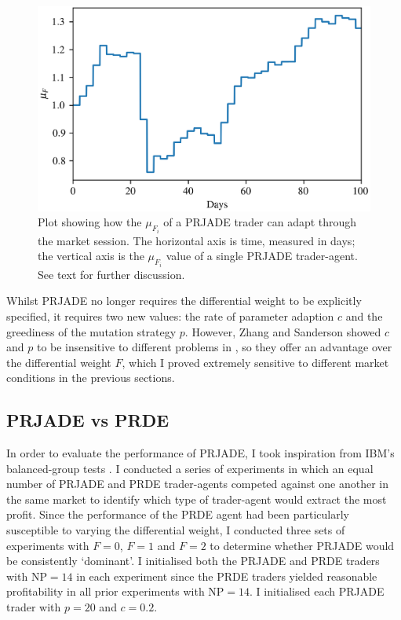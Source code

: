 \documentclass[a4paper,twoside]{article}
\begin{document}
\begin{figure}[htbp]
    \centerline{\includegraphics[width=\columnwidth]{mu_F_2.0.png}}
    \caption{
        Plot showing how the $\mu_{F_i}$ of a PRJADE trader can adapt through the market session.
        The horizontal axis is time, measured in days; the vertical axis is the $\mu_{F_i}$ value of a single PRJADE trader-agent.
        See text for further discussion.
    }
    \label{mu_F}
\end{figure}

Whilst PRJADE no longer requires the differential weight to be explicitly specified, it requires two new values: the rate of parameter adaption $c$ and the greediness of the mutation strategy $p$.
However, Zhang and Sanderson showed $c$ and $p$ to be insensitive to different problems in \cite{ZhangSanderson}, so they offer an advantage over the differential weight $F$, which I proved extremely sensitive to different market conditions in the previous sections.

\subsection{PRJADE vs PRDE}

In order to evaluate the performance of PRJADE, I took inspiration from IBM's balanced-group tests \cite{TesauroDas}.
I conducted a series of experiments in which an equal number of PRJADE and PRDE trader-agents competed against one another in the same market to identify which type of trader-agent would extract the most profit.
Since the performance of the PRDE agent had been particularly susceptible to varying the differential weight, I conducted three sets of experiments with $F=0$, $F=1$ and $F=2$ to determine whether PRJADE would be consistently `dominant'.
I initialised both the PRJADE and PRDE traders with $\mathrm{NP}=14$ in each experiment since the PRDE traders yielded reasonable profitability in all prior experiments with $\mathrm{NP}=14$.
I initialised each PRJADE trader with $p=20$ and $c=0.2$.
\end{document}
